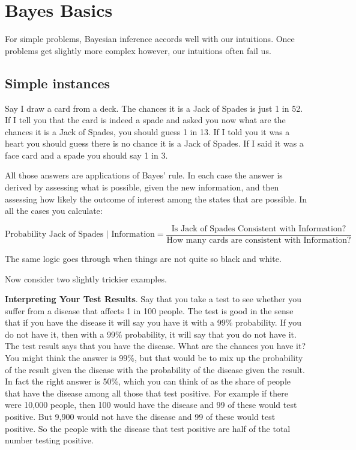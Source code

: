 \documentclass[
  12pt,
]{book}
\begin{document}
\hypertarget{bayes-basics}{%
\section{Bayes Basics}\label{bayes-basics}}

For simple problems, Bayesian inference accords well with our intuitions. Once problems get slightly more complex however, our intuitions often fail us.

\hypertarget{simple-instances}{%
\subsection{Simple instances}\label{simple-instances}}

Say I draw a card from a deck. The chances it is a Jack of Spades is just 1 in 52. If I tell you that the card is indeed a spade and asked you now what are the chances it is a Jack of Spades, you should guess 1 in 13. If I told you it was a heart you should guess there is no chance it is a Jack of Spades. If I said it was a face card and a spade you should say 1 in 3.

All those answers are applications of Bayes' rule. In each case the answer is derived by assessing what is possible, given the new information, and then assessing how likely the outcome of interest among the states that are possible. In all the cases you calculate:

\[\text{Probability Jack of Spades | Information} = \frac{\text{Is Jack of Spades Consistent with Information?}}{\text{How many cards are consistent with Information?}} \]

The same logic goes through when things are not quite so black and white.

Now consider two slightly trickier examples.

\textbf{Interpreting Your Test Results}. Say that you take a test to see whether you suffer from a disease that affects 1 in 100 people. The test is good in the sense that if you have the disease it will say you have it with a 99\% probability. If you do not have it, then with a 99\% probability, it will say that you do not have it. The test result says that you have the disease. What are the chances you have it? You might think the answer is 99\%, but that would be to mix up the probability of the result given the disease with the probability of the disease given the result. In fact the right answer is 50\%, which you can think of as the share of people that have the disease among all those that test positive. For example if there were 10,000 people, then 100 would have the disease and 99 of these would test positive. But 9,900 would not have the disease and 99 of these would test positive. So the people with the disease that test positive are half of the total number testing positive.
\end{document}
